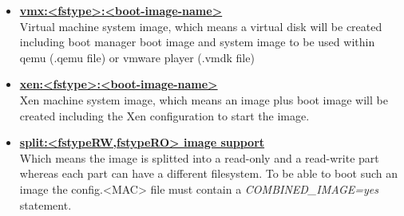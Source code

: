 \begin{itemize}
	\item \textbf{\underline{vmx:<fstype>:<boot-image-name>}}\\
          Virtual machine system image, which means a virtual disk will
          be created including boot manager boot image and system image
          to be used within qemu (.qemu file) or vmware player (.vmdk file)
    \item \textbf{\underline{xen:<fstype>:<boot-image-name>}}\\
          Xen machine system image, which means an image plus boot image will
          be created including the Xen configuration to start the image.
	\item \textbf{\underline{split:<fstypeRW,fstypeRO> image support}}\\
          Which means the image is splitted into a read-only and a
          read-write part whereas each part can have a different
          filesystem. To be able to boot such an image the config.<MAC>
          file must contain a \textit{COMBINED\_IMAGE=yes} statement.
\end{itemize}
